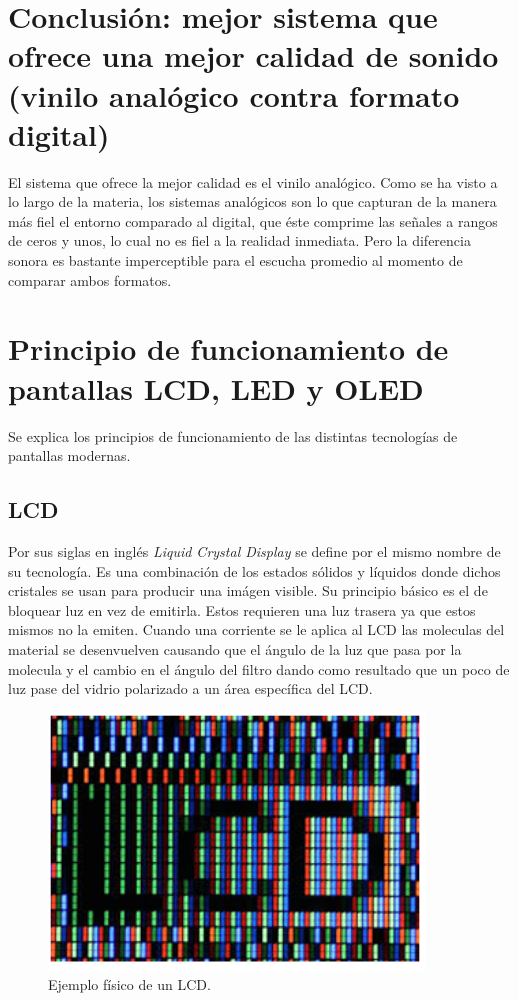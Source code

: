 \documentclass[letterpaper, 12pt]{article}
\begin{document}
    \section{Conclusión: mejor sistema que ofrece una mejor calidad de sonido (vinilo analógico contra formato digital)}
    \justify
    El sistema que ofrece la mejor calidad es el vinilo analógico. Como se ha visto a lo largo de la materia, los sistemas analógicos son lo que capturan de la manera más fiel
    el entorno comparado al digital, que éste comprime las señales a rangos de ceros y unos, lo cual no es fiel a la realidad inmediata. Pero la diferencia sonora es bastante imperceptible para el escucha promedio
    al momento de comparar ambos formatos.
    \section{Principio de funcionamiento de pantallas LCD, LED y OLED}
    \justify
    Se explica los principios de funcionamiento de las distintas tecnologías de pantallas modernas.
    \subsection{LCD}
    \justify
    Por sus siglas en inglés \emph{Liquid Crystal Display} se define por el mismo nombre de su tecnología. Es una combinación de los estados sólidos y líquidos donde dichos cristales se usan para
    producir una imágen visible. Su principio básico es el de bloquear luz en vez de emitirla. Estos requieren una luz trasera ya que estos mismos no la emiten. Cuando una corriente se le aplica al LCD
    las moleculas del material se desenvuelven causando que el ángulo de la luz que pasa por la molecula y el cambio en el ángulo del filtro dando como resultado que un poco de luz pase del vidrio polarizado
    a un área específica del LCD. 
    \begin{figure}[H]
        \centering
        \includegraphics[width=10cm]{LCD.png}
        \caption{Ejemplo físico de un LCD.}
    \end{figure} 
\end{document}
